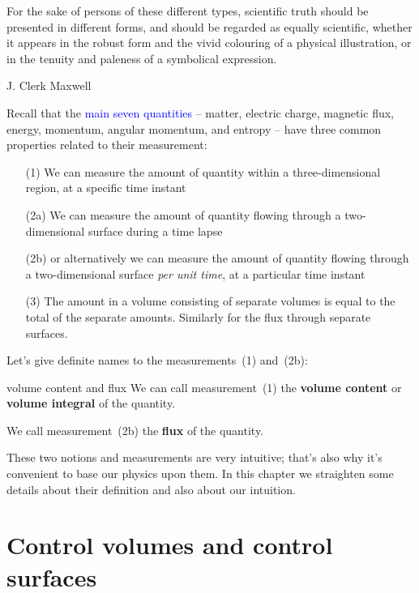 \documentclass[a4paper,12pt,%
onecolumn,oneside,titlepage,%
british%
]{memoir}
\renewcommand*{\|}[1][]{\nonscript\:#1\vert\nonscript\:\mathopen{}}
\newcommand*{\sect}{\S}%
\renewcommand*{\autoref}[2]{\sidepar{\vspace{-1ex}\footnotesize{\color{blue}\faIcon{%
reply%
}\enspace\sect\,\ref{#1} page\,\pageref{#1}}}\textcolor{blue}{#2}}
\begin{document}
\epigraph{For the sake of persons of these different types, scientific truth should be presented in different forms, and should be regarded as equally scientific, whether it appears in the robust form and the vivid colouring of a physical illustration, or in the tenuity and paleness of a symbolical expression.%
}{J. Clerk Maxwell \cites*{maxwell1870}}


Recall that the \autoref{cha:stuff}{main seven quantities} -- matter, electric charge, magnetic flux, energy, momentum, angular momentum, and entropy -- have three common properties related to their measurement:
\begin{enumerate}\color{green}
\item[(1)] We can measure the amount of quantity within a three-dimensional region, at a specific time instant
\item[(2a)] We can measure the amount of quantity flowing through a two-dimensional surface during a time lapse\textellipsis
\item[(2b)] \textellipsis or alternatively we can measure the amount of quantity flowing through a two-dimensional surface \emph{per unit time}, at a particular time instant
\item[(3)]\label{item:extensivity}The amount in a volume consisting of separate volumes is equal to the total of the separate amounts. Similarly for the flux through separate surfaces.
\end{enumerate}

Let's give definite names to the measurements~(1) and~(2b):
\begin{definition}{volume content and flux}
  We can call measurement~(1) the \textbf{volume content} or \textbf{volume integral} of the quantity.

  \smallskip

  We call measurement~(2b) the \textbf{flux} of the quantity. %
\end{definition}

\smallskip

These two notions and measurements are very intuitive; that's also why it's convenient to base our physics upon them. In this chapter we straighten some details about their definition and also about our intuition.

\section{Control volumes and control surfaces}
\label{sec:choice_surfaces}
\end{document}
